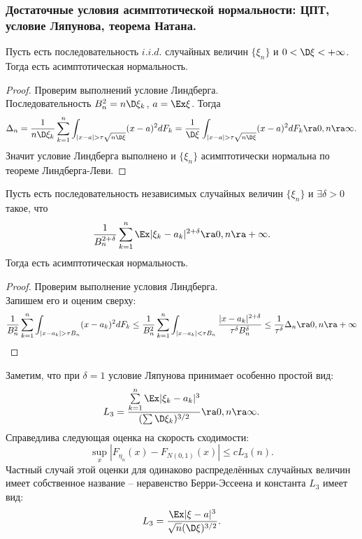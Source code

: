 \subsubsection{Достаточные условия асимптотической нормальности: ЦПТ, условие Ляпунова, теорема Натана.}
\begin{theorem}[ЦПТ]
    Пусть есть последовательность $i.i.d.$ случайных величин $\{\xi_n\}$ и $0 < \D \xi < +\infty$.
    Тогда есть асимптотическая нормальность.
\end{theorem}
\begin{proof}
    Проверим выполнений условие Линдберга. \\
    Последовательность $B_n^2 = n \D \xi_k$, $a = \Ex \xi$.
    Тогда
    \[
        \Delta_n  =\dfrac{1}{n \D \xi_k} \sum\limits_{k = 1}^{n} \int_{|x - a| > \tau \sqrt {n \D \xi}} (x - a)^2 dF_k = \dfrac{1}{\D \xi} \int_{|x - a| > \tau \sqrt {n \D \xi}} (x - a)^2 dF_k \ra 0, n \ra \infty.
    \]
    Значит условие Линдберга выполнено и $\{\xi_n\}$ асимптотически нормальна по теореме Линдберга-Леви.
\end{proof}
\begin{theorem}
    Пусть есть последовательность независимых случайных величин $\{\xi_n\}$ и $\exists \delta > 0$ такое, что 
    \[
        \dfrac{1}{B_n^{2 + \delta}}\sum\limits_{k = 1}^{n} \Ex|\xi_k - a_k|^{2 + \delta} \ra 0, n \ra +\infty.
    \]
    Тогда есть асимптотическая нормальность.
\end{theorem}
\begin{proof}
    Проверим выполнение условия Линдберга. \\
    Запишем его и оценим сверху:
    \[
        \dfrac{1}{B_n^2}\sum\limits_{k = 1}^{n} \int_{|x - a_k| > \tau B_n} (x - a_k)^{2}dF_k \leq \dfrac{1}{B_n^2}\sum\limits_{k = 1}^{n} \int_{|x - a_k| < \tau B_n} \dfrac{|x - a_k|^{2 + \delta}}{\tau^\delta B_n^{\delta}} \leq \dfrac{1}{\tau^\delta} \Delta_n \ra 0, n \ra  +\infty
    \]
\end{proof}
\begin{note}
    Заметим, что при $\delta = 1$ условие Ляпунова принимает особенно простой вид:
    \[
        L_3 = \dfrac{\sum\limits_{k = 1}^{n} \Ex |\xi_k - a_k|^3}{(\sum \D \xi_k)^{3/2}} \ra 0, n \ra \infty.
    \]
    Справедлива следующая оценка на скорость сходимости:
    \[
        \sup\limits_{x} |F_{\eta_n}(x) - F_{N(0, 1)}(x)| \leq cL_3(n).
    \]
    Частный случай этой оценки для одинаково распределённых случайных величин имеет собственное название -- неравенство Берри-Эссеена и константа $L_3$ имеет вид:
    \[
        L_3 = \dfrac{\Ex |\xi - a|^3}{\sqrt {n} (\D \xi)^{3/2}}.
    \]
\end{note}
\begin{theorem}

\end{theorem}
